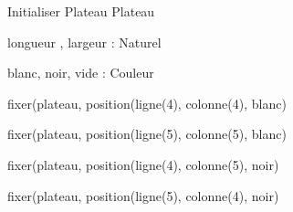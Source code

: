 \begin{algorithme}
	\small
	\fonction
	{Initialiser Plateau}
	{}
	{Plateau}
	{longueur , largeur : Naturel
	 
	blanc, noir, vide : Couleur}
	{
	
	fixer(plateau, position(ligne(4), colonne(4), blanc)
	
	fixer(plateau, position(ligne(5), colonne(5), blanc)

	fixer(plateau, position(ligne(4), colonne(5), noir)

	fixer(plateau, position(ligne(5), colonne(4), noir)
	}
\end{algorithme}